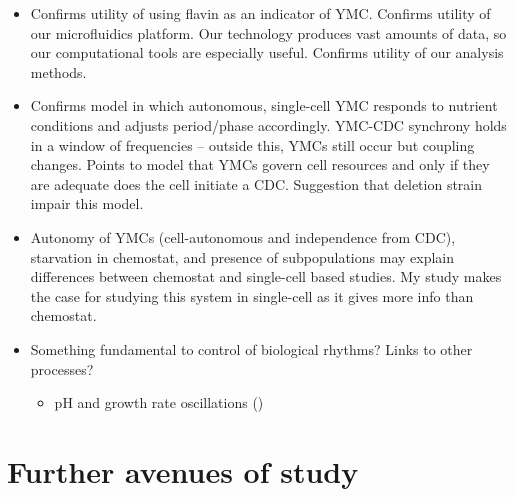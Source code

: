 \begin{itemize}
\item Confirms utility of using flavin as an indicator of YMC.  Confirms utility of our microfluidics platform.  Our technology produces vast amounts of data, so our computational tools are especially useful.  Confirms utility of our analysis methods.
\item Confirms model in which autonomous, single-cell YMC responds to nutrient conditions and adjusts period/phase accordingly.  YMC-CDC synchrony holds in a window of frequencies -- outside this, YMCs still occur but coupling changes.  Points to model that YMCs govern cell resources and only if they are adequate does the cell initiate a CDC.  Suggestion that deletion strain impair this model.
\item Autonomy of YMCs (cell-autonomous and independence from CDC), starvation in chemostat, and presence of subpopulations may explain differences between chemostat and single-cell based studies.  My study makes the case for studying this system in single-cell as it gives more info than chemostat.
\item Something fundamental to control of biological rhythms?  Links to other processes?
\begin{itemize}
\item pH and growth rate oscillations (\textcite{luziaPHDependenciesGlycolytic})
\end{itemize}
\end{itemize}



\section{Further avenues of study}
\label{sec:concl-further}
